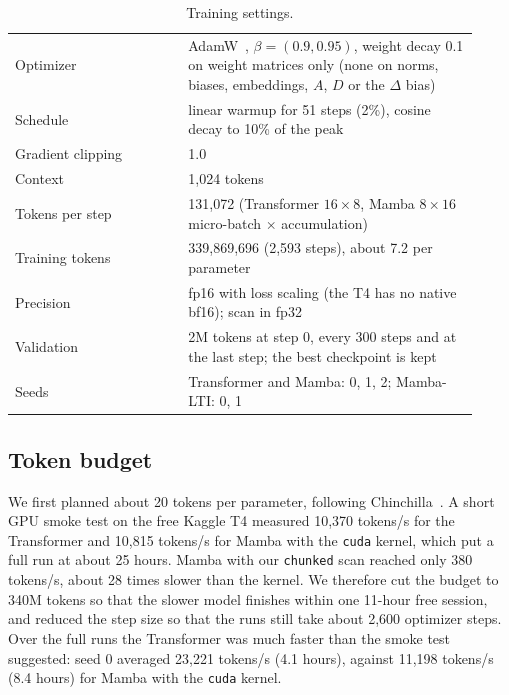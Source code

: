 \documentclass[conference]{IEEEtran}
\begin{document}
\begin{table}[t]
\centering
\caption{Training settings.}
\label{tab:train}
\begin{tabular}{@{}p{0.34\linewidth}p{0.58\linewidth}@{}}
\toprule
Optimizer & AdamW~\cite{loshchilov2019adamw}, $\beta = (0.9, 0.95)$, weight decay 0.1 on weight matrices only (none on norms, biases, embeddings, $A$, $D$ or the $\Delta$ bias) \\
Schedule & linear warmup for 51 steps (2\%), cosine decay to 10\% of the peak \\
Gradient clipping & 1.0 \\
Context & 1,024 tokens \\
Tokens per step & 131,072 (Transformer $16 \times 8$, Mamba $8 \times 16$ micro-batch $\times$ accumulation) \\
Training tokens & 339,869,696 (2,593 steps), about 7.2 per parameter \\
Precision & fp16 with loss scaling (the T4 has no native bf16); scan in fp32 \\
Validation & 2M tokens at step 0, every 300 steps and at the last step; the best checkpoint is kept \\
Seeds & Transformer and Mamba: 0, 1, 2; Mamba-LTI: 0, 1 \\
\bottomrule
\end{tabular}
\end{table}

\subsection{Token budget}
We first planned about 20 tokens per parameter, following Chinchilla~\cite{hoffmann2022chinchilla}. A
short GPU smoke test on the free Kaggle T4 measured 10,370 tokens/s for the Transformer and
10,815 tokens/s for Mamba with the \texttt{cuda} kernel, which put a full run at about 25 hours. Mamba
with our \texttt{chunked} scan reached only 380 tokens/s, about 28 times slower than the kernel. We
therefore cut the budget to 340M tokens so that the slower model finishes within one 11-hour free
session, and reduced the step size so that the runs still take about 2,600 optimizer steps. Over the
full runs the Transformer was much faster than the smoke test suggested: seed 0 averaged
23,221 tokens/s (4.1 hours), against 11,198 tokens/s (8.4 hours) for Mamba with the \texttt{cuda}
kernel.
\end{document}
